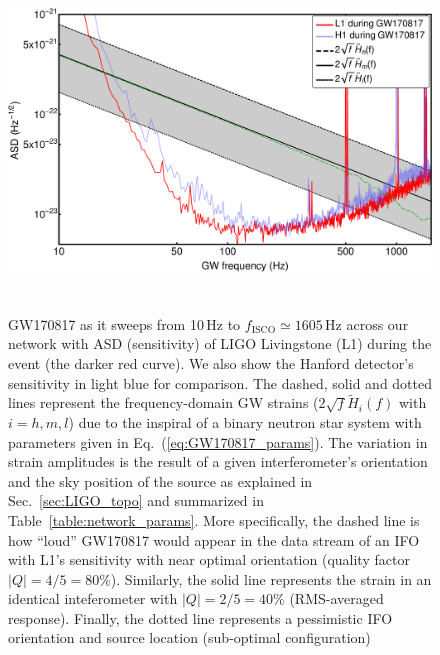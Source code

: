 \documentclass[prd,amsmath,amssymb,aps,floats,amsfonts,notitlepage,superscriptaddress,eqsecnum,nofootinbib,10pt]{revtex4-1}
\begin{document}
%
%
\begin{figure}[ht!]
\includegraphics[height=9cm]{../Figures/GW170817_strains.pdf}
\caption{GW170817 as it sweeps from 10\,Hz to $f_\text{ISCO} \simeq1605\,$Hz across our network with ASD (sensitivity) of 
LIGO Livingstone (L1) during the event (the darker red curve).
We also show the Hanford detector's sensitivity in light blue for comparison. The dashed, solid and dotted lines represent the 
frequency-domain GW strains ($2\sqrt{f} \tilde{H}_i(f)$ with $i=h,m,l$) due to the inspiral of
a binary neutron star system with parameters given in Eq.~(\ref{eq:GW170817_params}).
The variation in strain amplitudes is the result of a given interferometer's orientation and the sky position of the source 
as explained in Sec.~\ref{sec:LIGO_topo} and summarized in Table~\ref{table:network_params}.
More specifically, the dashed line is how ``loud'' GW170817 would appear in the data stream of an IFO with L1's sensitivity
with near optimal orientation
(quality factor $|Q|=4/5=80\%$). Similarly, the solid line represents the strain in an identical inteferometer with 
$|Q|=2/5=40\%$ (RMS-averaged response). %
Finally, the dotted line represents a pessimistic IFO orientation and source location (sub-optimal configuration)
}
\end{figure}
\end{document}
